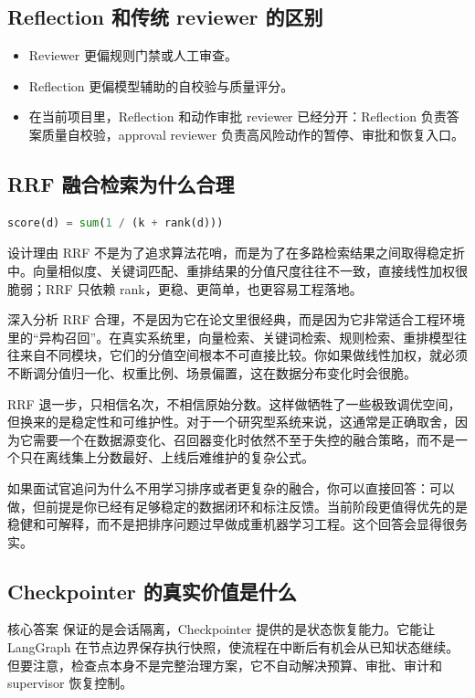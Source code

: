 \documentclass[12pt]{article}
\begin{document}
\subsection{Reflection 和传统 reviewer 的区别}
\begin{itemize}[leftmargin=2em]
  \item Reviewer 更偏规则门禁或人工审查。
  \item Reflection 更偏模型辅助的自校验与质量评分。
  \item 在当前项目里，Reflection 和动作审批 reviewer 已经分开：Reflection 负责答案质量自校验，approval reviewer 负责高风险动作的暂停、审批和恢复入口。
\end{itemize}

\subsection{RRF 融合检索为什么合理}
\begin{lstlisting}[language=Python,caption={RRF 的直观公式}]
score(d) = sum(1 / (k + rank(d)))
\end{lstlisting}

\begin{summaryBox}{设计理由}
RRF 不是为了追求算法花哨，而是为了在多路检索结果之间取得稳定折中。向量相似度、关键词匹配、重排结果的分值尺度往往不一致，直接线性加权很脆弱；RRF 只依赖 rank，更稳、更简单，也更容易工程落地。
\end{summaryBox}

\begin{analysisBox}{深入分析}
RRF 合理，不是因为它在论文里很经典，而是因为它非常适合工程环境里的“异构召回”。在真实系统里，向量检索、关键词检索、规则检索、重排模型往往来自不同模块，它们的分值空间根本不可直接比较。你如果做线性加权，就必须不断调分值归一化、权重比例、场景偏置，这在数据分布变化时会很脆。

RRF 退一步，只相信名次，不相信原始分数。这样做牺牲了一些极致调优空间，但换来的是稳定性和可维护性。对于一个研究型系统来说，这通常是正确取舍，因为它需要一个在数据源变化、召回器变化时依然不至于失控的融合策略，而不是一个只在离线集上分数最好、上线后难维护的复杂公式。

如果面试官追问为什么不用学习排序或者更复杂的融合，你可以直接回答：可以做，但前提是你已经有足够稳定的数据闭环和标注反馈。当前阶段更值得优先的是稳健和可解释，而不是把排序问题过早做成重机器学习工程。这个回答会显得很务实。
\end{analysisBox}

\subsection{Checkpointer 的真实价值是什么}
\begin{qaBox}{核心答案}
 保证的是会话隔离，Checkpointer 提供的是状态恢复能力。它能让 LangGraph 在节点边界保存执行快照，使流程在中断后有机会从已知状态继续。但要注意，检查点本身不是完整治理方案，它不自动解决预算、审批、审计和 supervisor 恢复控制。
\end{qaBox}
\end{document}

